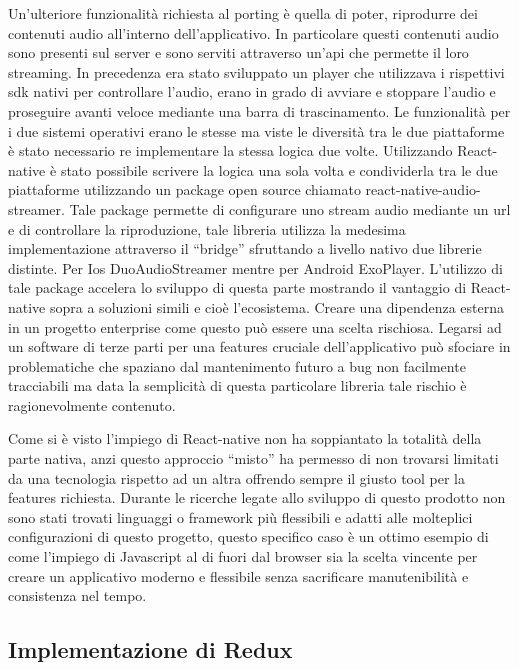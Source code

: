 Un'ulteriore funzionalità richiesta al porting è quella di poter, riprodurre dei contenuti audio all’interno dell’applicativo. In particolare questi contenuti audio sono presenti sul server e sono serviti attraverso un'api che permette il loro streaming. In precedenza era stato sviluppato un player che utilizzava i rispettivi sdk nativi per controllare l’audio, erano in grado di avviare e stoppare l’audio e proseguire avanti veloce mediante una barra di trascinamento. Le funzionalità per i due sistemi operativi erano le stesse ma viste le diversità tra le due piattaforme è stato necessario re implementare la stessa logica due volte. Utilizzando React-native è stato possibile scrivere la logica una sola volta e condividerla tra le due piattaforme utilizzando un package open source chiamato react-native-audio-streamer. Tale package permette di configurare uno stream audio mediante un url e di controllare la riproduzione, tale libreria utilizza la medesima implementazione attraverso il “bridge” sfruttando a livello nativo due librerie distinte. Per Ios DuoAudioStreamer mentre per Android ExoPlayer. L’utilizzo di tale package accelera lo sviluppo di questa parte mostrando il vantaggio di React-native sopra a soluzioni simili e cioè l’ecosistema. Creare una dipendenza esterna in un progetto enterprise come questo può essere una scelta rischiosa. Legarsi ad un software di terze parti per una features cruciale dell’applicativo può sfociare in problematiche che spaziano dal mantenimento futuro a bug non facilmente tracciabili ma data la semplicità di questa particolare libreria tale rischio è ragionevolmente contenuto.\vspace{5mm}

Come si è visto l’impiego di React-native non ha soppiantato la totalità della parte nativa, anzi questo approccio “misto” ha permesso di non trovarsi limitati da una tecnologia rispetto ad un altra offrendo sempre il giusto tool per la features richiesta. Durante le ricerche legate allo sviluppo di questo prodotto non sono stati trovati linguaggi o framework più flessibili e adatti alle molteplici configurazioni di questo progetto, questo specifico caso è un ottimo esempio di come l’impiego di Javascript al di fuori dal browser sia la scelta vincente per creare un applicativo moderno e flessibile senza sacrificare manutenibilità e consistenza nel tempo.\vspace{5mm}

\subsection{Implementazione di Redux}\vspace{5mm}


